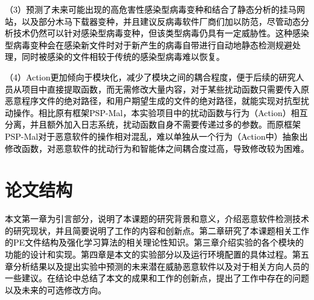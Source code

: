 \textcolor{black}{（3）预测了未来可能出现的高危害性感染型病毒变种和结合了静态分析的挂马网站，以及部分木马下载器变种，并且建议反病毒软件厂商们加以防范，尽管动态分析技术仍然可以针对感染型病毒变种，但该类型病毒仍具有一定威胁性。这种感染型病毒变种会在感染新文件时对于新产生的病毒自带进行自动地静态检测规避处理，同时被感染的文件相较于传统的感染型病毒难以恢复。}

\textcolor{black}{（4）Action更加倾向于模块化，减少了模块之间的耦合程度，便于后续的研究人员从项目中直接提取函数，而无需修改大量内容，对于某些扰动函数只需要传入原恶意程序文件的绝对路径，和用户期望生成的文件的绝对路径，就能实现对抗型扰动操作。相比原有框架PSP-Mal\parencite{ref12}，本实验项目中的扰动函数与行为（Action）相互分离，并且额外加入日志系统，扰动函数自身不需要传递过多的参数。而原框架PSP-Mal对于恶意软件的操作相对混乱，难以单独从一个行为（Action中）抽象出修改函数，对恶意软件的扰动行为和智能体之间耦合度过高，导致修改较为困难。}

\section{论文结构}
\textcolor{black}{本文第一章为引言部分，说明了本课题的研究背景和意义，介绍恶意软件检测技术的研究现状，并且简要说明了工作的内容和创新点。第二章研究了本课题相关工作的PE文件结构及强化学习算法的相关理论性知识。第三章介绍实验的各个模块的功能的设计和实现。第四章是本文的实验部分以及运行环境配置的具体过程。第五章分析结果以及提出实验中预测的未来潜在威胁恶意软件以及对于相关方向人员的一些建议。在结论中总结了本文的成果和工作的创新点，提出了工作中存在的问题以及未来的可选修改方向。}